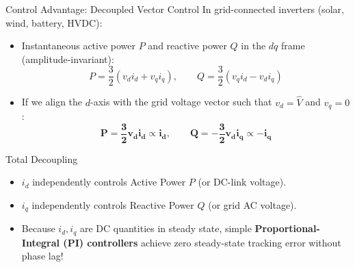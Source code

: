 \begin{frame}[allowframebreaks]{Control Advantage: Decoupled Vector Control}
    In grid-connected inverters (solar, wind, battery, HVDC):
    \begin{itemize}
        \item Instantaneous active power $P$ and reactive power $Q$ in the $dq$ frame (amplitude-invariant):
        \begin{equation}
            P = \frac{3}{2}(v_d i_d + v_q i_q), \qquad Q = \frac{3}{2}(v_q i_d - v_d i_q)
        \end{equation}
        \item If we align the $d$-axis with the grid voltage vector such that $v_d = \hat{V}$ and $v_q = 0$:
        \begin{equation}
            \mathbf{P = \frac{3}{2} v_d i_d \propto i_d}, \qquad \mathbf{Q = -\frac{3}{2} v_d i_q \propto -i_q}
        \end{equation}
    \end{itemize}

    \begin{alertblock}{Total Decoupling}
        \begin{itemize}
            \item $i_d$ independently controls Active Power $P$ (or DC-link voltage).
            \item $i_q$ independently controls Reactive Power $Q$ (or grid AC voltage).
            \item Because $i_d, i_q$ are DC quantities in steady state, simple \textbf{Proportional-Integral (PI) controllers} achieve zero steady-state tracking error without phase lag!
        \end{itemize}
    \end{alertblock}
\end{frame}

